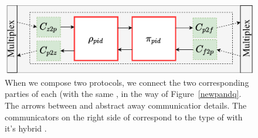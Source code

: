 \begin{figure}
\centering
\includegraphics[scale=0.5]{figures/newcompose.pdf}
\caption{When we compose two protocols, we connect the two corresponding parties of each (with the same , in the way of Figure~\ref{newpandq}. The arrows between \RHO and \PI abstract away communicatior details. The communicators on the right side of \PI correspond to the type of \PI with it's hybrid \F.}
\label{fig:replacement}
\end{figure}


